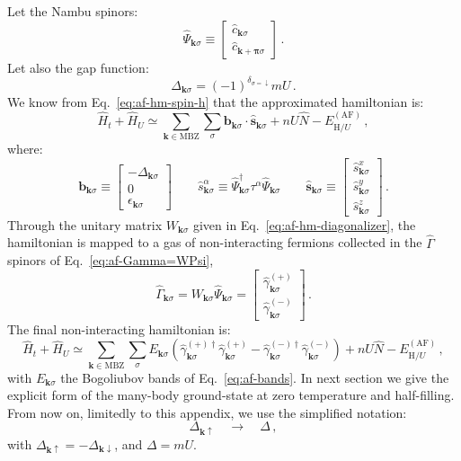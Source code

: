Let the Nambu spinors:
\[
	\hat \Psi_{\mathbf{k}\sigma} \equiv \begin{bmatrix}
		\hat c_{\mathbf{k}\sigma} \\
		\hat c_{\mathbf{k}+\bm{\pi}\sigma} 
	\end{bmatrix} \, .
\]
Let also the gap function:
\[
	\Delta_{\mathbf{k}\sigma} = (-1)^{\delta_{\sigma=\downarrow}} mU \, .
\]
We know from Eq.~\eqref{eq:af-hm-spin-h} that the approximated hamiltonian is:
\[
	\hat H_t + \hat H_U \simeq \sum_{\mathbf{k} \in \mathrm{MBZ}} \sum_\sigma \mathbf{b}_{\mathbf{k}\sigma} \cdot \hat{\mathbf{s}}_{\mathbf{k}\sigma} + nU \hat N - E_{\mathrm{H}/U}^{(\mathrm{AF})} \, ,
\]
where:
\[
	\mathbf{b}_{\mathbf{k}\sigma} \equiv \begin{bmatrix}
		-\Delta_{\mathbf{k}\sigma} \\ 0 \\ \epsilon_{\mathbf{k}\sigma} 
	\end{bmatrix} 
	\qquad
	\hat s_{\mathbf{k}\sigma}^\alpha \equiv \hat \Psi_{\mathbf{k}\sigma}^\dagger \tau^\alpha \hat \Psi_{\mathbf{k}\sigma}
	\qquad
	\hat{\mathbf{s}}_{\mathbf{k}\sigma} \equiv \begin{bmatrix}
		\hat s_{\mathbf{k}\sigma}^x \\
		\hat s_{\mathbf{k}\sigma}^y \\
		\hat s_{\mathbf{k}\sigma}^z
	\end{bmatrix} \, .
\]
Through the unitary matrix $W_{\mathbf{k}\sigma}$ given in Eq.~\eqref{eq:af-hm-diagonalizer}, the hamiltonian is mapped to a gas of non-interacting fermions collected in the $\hat \Gamma$ spinors of Eq.~\eqref{eq:af-Gamma=WPsi},
\[
	\hat\Gamma_{\mathbf{k}\sigma} = W_{\mathbf{k}\sigma} \hat \Psi_{\mathbf{k}\sigma} = \begin{bmatrix}
		\hat \gamma_{\mathbf{k}\sigma}^{(+)} \\ \hat \gamma_{\mathbf{k}\sigma}^{(-)}
	\end{bmatrix} \, .
\]
The final non-interacting hamiltonian is:
\[
	\hat H_t + \hat H_U \simeq \sum_{\mathbf{k} \in \mathrm{MBZ}} \sum_\sigma E_{\mathbf{k}\sigma} \left(
		\hat \gamma_{\mathbf{k}\sigma}^{(+)\dagger} \hat \gamma_{\mathbf{k}\sigma}^{(+)} - \hat \gamma_{\mathbf{k}\sigma}^{(-)\dagger} \hat \gamma_{\mathbf{k}\sigma}^{(-)}
	\right) + nU \hat N -  E_{\mathrm{H}/U}^{(\mathrm{AF})} \, ,
\]
with $E_{\mathbf{k}\sigma}$ the Bogoliubov bands of Eq.~\eqref{eq:af-bands}. In next section we give the explicit form of the many-body ground-state at zero temperature and half-filling. From now on, limitedly to this appendix, we use the simplified notation:
\[
	\Delta_{\mathbf{k}\uparrow} \quad\to\quad \Delta \, ,
\]
with $\Delta_{\mathbf{k}\uparrow} = -\Delta_{\mathbf{k}\downarrow}$, and $\Delta=mU$.

